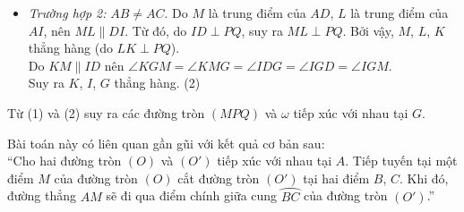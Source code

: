 \begin{bt}
{\begin{itemize}
			\item \textit{Trường hợp 2:} $AB \neq AC$. Do $M$ là trung điểm của $AD$, $L$ là trung điểm của $AI$, nên $ML \parallel DI$. Từ đó, do $ID \perp PQ$, suy ra $ML \perp PQ$. Bởi vậy, $M$, $L$, $K$ thẳng hàng (do $LK \perp PQ$).\\
			Do $KM \parallel ID$ nên $\angle KGM = \angle KMG = \angle IDG = \angle IGD = \angle IGM$.\\
			Suy ra $K$, $I$, $G$ thẳng hàng. \hfill (2)
		\end{itemize}
		Từ (1) và (2) suy ra các đường tròn $(MPQ)$ và $\omega$ tiếp xúc với nhau tại $G$.
		\begin{nx}
			Bài toán này có liên quan gần gũi với kết quả cơ bản sau:\\
			``Cho hai đường tròn $(O)$ và $(O')$ tiếp xúc với nhau tại $A$. Tiếp tuyến tại một điểm $M$ của đường tròn $(O)$ cắt đường tròn $(O')$ tại hai điểm $B$, $C$. Khi đó, đường thẳng $AM$ sẽ đi qua điểm chính giữa cung $\wideparen{BC}$ của đường tròn $(O')$.''
		\end{nx}
	}
\end{bt}
